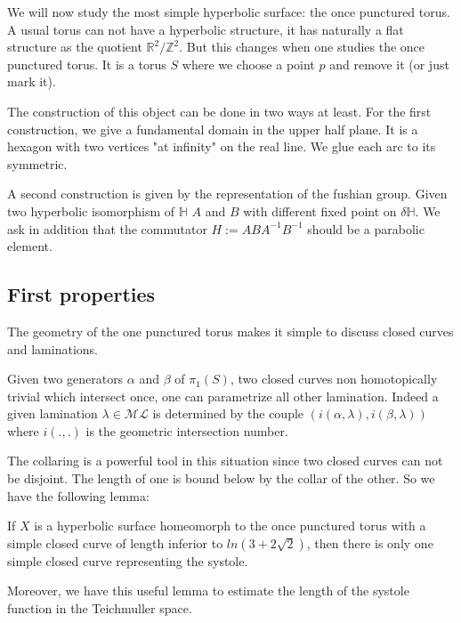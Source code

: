 We will now study the most simple hyperbolic surface: the once punctured torus.
A usual torus can not have a hyperbolic structure, it has naturally a flat structure as the quotient $\mathbb{R}^2 / \mathbb{Z}^2$.
But this changes when one studies the once punctured torus. It is a torus $S$ where we choose a point $p$ and remove it (or just mark it).


The construction of this object can be done in two ways at least.
For the first construction, we give a fundamental domain in the upper half plane. It is a hexagon with two vertices "at infinity" on the real line. We glue each arc to its symmetric.



A second construction is given by the representation of the fushian group. Given two hyperbolic isomorphism of $\mathbb{H}$ $A$ and $B$ with different fixed point on $\delta \mathbb{H}$. We ask in addition that the commutator $H := ABA^{-1}B^{-1}$ should be a parabolic element.

\subsection{First properties}

The geometry of the one punctured torus makes it simple to discuss closed curves and laminations.
\begin{rmq}
Given two generators $\alpha$ and $\beta$ of $\pi_1(S)$, two closed curves non homotopically trivial which intersect once, one can parametrize all other lamination.
Indeed a given lamination $\lambda \in \mathcal{ML}$ is determined by the couple $(i(\alpha,\lambda),i(\beta,\lambda))$ where $i(.,.)$ is the geometric intersection number.
\end{rmq}

The collaring is a powerful tool in this situation since two closed curves can not be disjoint. The length of one is bound below by the collar of the other. So we have the following lemma:

\begin{lem}
If $X$ is a hyperbolic surface homeomorph to the once punctured torus with a simple closed curve of length inferior to $ln(3+2 \sqrt{2})$, then there is only one simple closed curve representing the systole.
\end{lem}

Moreover, we have this useful lemma to estimate the length of the systole function in the Teichmuller space.

